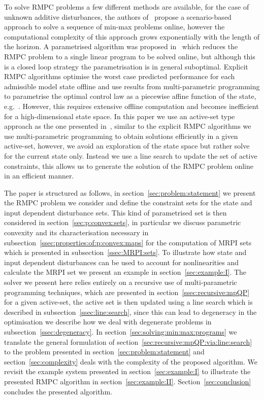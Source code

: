 \documentclass[journal]{IEEEtran}
\theoremstyle{remark}
\theoremstyle{definition}
\begin{document}
To solve RMPC problems a few different methods are available, for the case of unknown additive disturbances, 
the authors of~\cite{Scokaert:1998} propose a scenario-based approach to solve a sequence of min-max problems online, 
however the computational complexity of this approach grows exponentially with the length of the horizon. 
%
A parametrised algorithm was proposed in~\cite{Rakovic:2012} which reduces the RMPC problem to a single linear 
program to be solved online, but although this is a closed loop strategy the parametrisation is in general 
suboptimal. 
%
Explicit RMPC algorithms optimise the worst case predicted performance for each admissible model state offline and
use results from multi-parametric programming to parametrise the optimal control law as a piecewise affine function of the
state, e.g.~\cite{Bemporad:2003,Diehl:2004}.
%
However, this requires extensive offline computation and becomes inefficient for a high-dimensional state space.
%
In this paper we use an active-set type approach as the one presented in~\cite{Buerger:ACC,Schaich:NMPC:2015}, 
similar to the explicit RMPC algorithms we use multi-parametric programming to obtain solutions efficiently
in a given active-set, however, we avoid an exploration of the state space but rather solve for the current 
state only.
%
Instead we use a line search to update the set of active constraints, this allows us to generate
the solution of the RMPC problem online in an efficient manner.

The paper is structured as follows, in section~\ref{sec:problem:statement} we present the RMPC problem we consider
and define the constraint sets for the state and input dependent disturbance sets.
%
This kind of parametrised set is then considered in section~\ref{sec:p:convex:sets}, in particular we discuss
parametric convexity and its characterisation necessary in subsection~\ref{ssec:properties:of:p:convex:maps} 
for the computation of MRPI sets which is presented in subsection~\ref{ssec:MRPI:sets}.
%
To illustrate how state and input dependent disturbances can be used to account for nonlinearities and 
calculate the MRPI set we present an example in section~\ref{sec:example:I}.
%
The solver we present here relies entirely on a recursive use of multi-parametric programming techniques, 
which are presented in section~\ref{ssec:recursive:mpQP} for a given active-set, the active set is then
updated using a line search which is described in subsection~\ref{ssec:line:search}, since this can lead
to degeneracy in the optimisation we describe how we deal with degenerate problems in subsection~\ref{ssec:degeneracy}.
%
In section~\ref{sec:solving:min:max:programs} we translate the general formulation of section~\ref{sec:recursive:mpQP:via:line:search}
to the problem presented in section~\ref{sec:problem:statement} and section~\ref{sec:complexity}
deals with the complexity of the proposed algorithm.
%
We revisit the example system presented in section~\ref{sec:example:I} to illustrate the presented RMPC
algorithm in section~\ref{sec:example:II}.
%
Section~\ref{sec:conclusion} concludes the presented algorithm.
\end{document}
